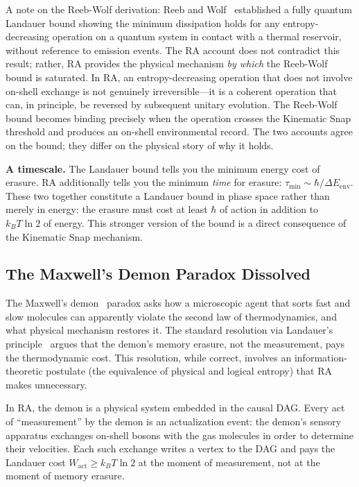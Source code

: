 \documentclass[11pt,a4paper]{article}
\theoremstyle{plain}
\theoremstyle{definition}
\theoremstyle{remark}
\begin{document}
A note on the Reeb-Wolf derivation: Reeb and Wolf~\citep{ReebWolf2014} established
a fully quantum Landauer bound showing the minimum dissipation holds for any
entropy-decreasing operation on a quantum system in contact with a thermal
reservoir, without reference to emission events. The RA account does not contradict
this result; rather, RA provides the physical mechanism \emph{by which} the Reeb-Wolf
bound is saturated. In RA, an entropy-decreasing operation that does not involve
on-shell exchange is not genuinely irreversible---it is a coherent operation that
can, in principle, be reversed by subsequent unitary evolution. The Reeb-Wolf bound
becomes binding precisely when the operation crosses the Kinematic Snap threshold
and produces an on-shell environmental record. The two accounts agree on the bound;
they differ on the physical story of why it holds.

\textbf{A timescale.} The Landauer bound tells you the minimum energy cost of
erasure. RA additionally tells you the minimum \emph{time} for erasure:
$\tau_{\mathrm{min}} \sim \hbar / \Delta E_{\mathrm{env}}$. These two together
constitute a Landauer bound in phase space rather than merely in energy: the
erasure must cost at least $\hbar$ of action in addition to $k_B T \ln 2$ of
energy. This stronger version of the bound is a direct consequence of the
Kinematic Snap mechanism.

\subsection{The Maxwell's Demon Paradox Dissolved}

The Maxwell's demon~\citep{Maxwell1872} paradox asks how a microscopic agent that
sorts fast and slow molecules can apparently violate the second law of
thermodynamics, and what physical mechanism restores it. The standard resolution
via Landauer's principle~\citep{Bennett1982} argues that the demon's memory
erasure, not the measurement, pays the thermodynamic cost. This resolution, while
correct, involves an information-theoretic postulate (the equivalence of physical
and logical entropy) that RA makes unnecessary.

In RA, the demon is a physical system embedded in the causal DAG. Every act of
``measurement'' by the demon is an actualization event: the demon's sensory
apparatus exchanges on-shell bosons with the gas molecules in order to determine
their velocities. Each such exchange writes a vertex to the DAG and pays the
Landauer cost $W_{\mathrm{act}} \geq k_B T \ln 2$ at the moment of measurement,
not at the moment of memory erasure.
\end{document}
